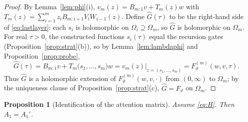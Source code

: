 \documentclass[11pt]{article}
\newtheorem{proposition}[theorem]{Proposition}
\theoremstyle{definition}
\theoremstyle{remark}
\theoremstyle{plain}
\begin{document}
\begin{proof}
By Lemma~\ref{lem:phi}(i), $v_m(z)=B_{m:1}v+T_m(z)w$ with
$T_m(z)=\sum_{i=1}^m z_iB_{m:i+1}V_iW_{i-1}(z)$.  Define $\widehat G(\tau)$ to be the
right-hand side of \eqref{eq:lastlayer}: each $s_i$ is holomorphic on
$\Omega_i\supseteq\Omega_m$, so $\widehat G$ is holomorphic on $\Omega_m$.  For real
$\tau>0$, the constructed functions $s_i(\tau)$ equal the recursion gates
(Proposition~\ref{prop:strat}(b)), so by Lemma~\ref{lem:lambdaphi} and
Proposition~\ref{prop:probe},
\[
\widehat G(\tau)=B_{m:1}v+T_m\big(s_1,\dots,s_m\big)w
=v_m(z)\big|_{z=(s_1,\dots,s_m)}=F^{(m)}_\vartheta(w,v,\tau).
\]
Thus $\widehat G$ is a holomorphic extension of $F^{(m)}_\vartheta(w,v,\cdot)$ from
$(0,\infty)$ to $\Omega_m$; by the uniqueness clause of
Proposition~\ref{prop:strat}(c), $\widehat G=F_\vartheta$ on $\Omega_m$.
\end{proof}

\begin{proposition}[Identification of the attention matrix]\label{prop:A1}
Assume \eqref{eq:H}.  Then $A_1=A_1'$.
\end{proposition}
\end{document}

